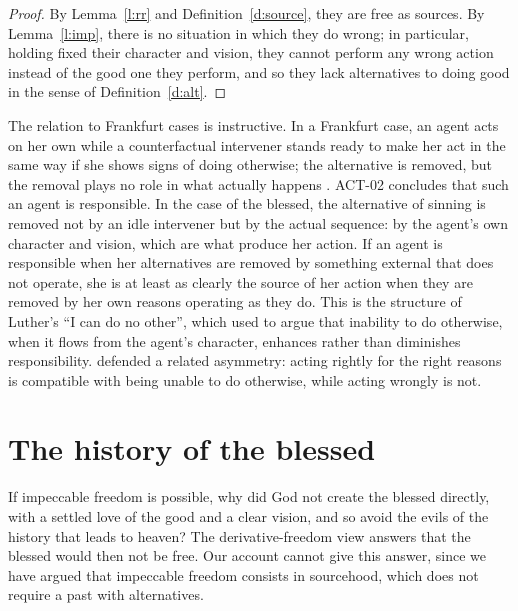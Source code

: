 \documentclass{situationist-preprint}
\begin{document}
\begin{proof}
By Lemma~\ref{l:rr} and Definition~\ref{d:source}, they are free as sources. By Lemma~\ref{l:imp}, there is no situation in which they do wrong; in particular, holding fixed their character and vision, they cannot perform any wrong action instead of the good one they perform, and so they lack alternatives to doing good in the sense of Definition~\ref{d:alt}.
\end{proof}

The relation to Frankfurt cases is instructive. In a Frankfurt case, an agent acts on her own while a counterfactual intervener stands ready to make her act in the same way if she shows signs of doing otherwise; the alternative is removed, but the removal plays no role in what actually happens \citep{Frankfurt1969}. ACT-02 concludes that such an agent is responsible. In the case of the blessed, the alternative of sinning is removed not by an idle intervener but by the actual sequence: by the agent's own character and vision, which are what produce her action. If an agent is responsible when her alternatives are removed by something external that does not operate, she is at least as clearly the source of her action when they are removed by her own reasons operating as they do. This is the structure of Luther's \enquote{I can do no other}, which \citet[ch.~6]{Dennett1984} used to argue that inability to do otherwise, when it flows from the agent's character, enhances rather than diminishes responsibility. \citet{Wolf1990} defended a related asymmetry: acting rightly for the right reasons is compatible with being unable to do otherwise, while acting wrongly is not.

\section{The history of the blessed}\label{s:history}

If impeccable freedom is possible, why did God not create the blessed directly, with a settled love of the good and a clear vision, and so avoid the evils of the history that leads to heaven? The derivative-freedom view answers that the blessed would then not be free. Our account cannot give this answer, since we have argued that impeccable freedom consists in sourcehood, which does not require a past with alternatives.
\end{document}
